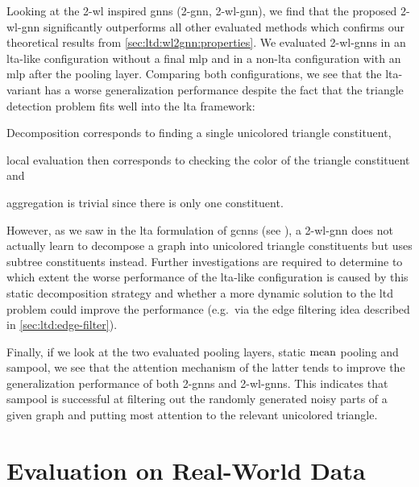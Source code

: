 Looking at the 2-\acs{wl} inspired \acp{gnn} (2-\acs{gnn}, 2-\acs{wl}-\acs{gnn}), we find that the proposed 2-\acs{wl}-\acs{gnn} significantly outperforms all other evaluated methods which confirms our theoretical results from \cref{sec:ltd:wl2gnn:properties}.
We evaluated 2-\acs{wl}-\acsp{gnn} in an \acs{lta}-like configuration without a final \ac{mlp} and in a non-\acs{lta} configuration with an \ac{mlp} after the pooling layer.
Comparing both configurations, we see that the \acs{lta}-variant has a worse generalization performance despite the fact that the triangle detection problem fits well into the \ac{lta} framework:
\begin{enumerate*}[label={\circled{\small\arabic*}}]
	\item Decomposition corresponds to finding a single unicolored triangle constituent,
	\item local evaluation then corresponds to checking the color of the triangle constituent and
	\item aggregation is trivial since there is only one constituent.
\end{enumerate*}

However, as we saw in the \ac{lta} formulation of \acp{gcnn} (see ), a 2-\acs{wl}-\acs{gnn} does not actually learn to decompose a graph into unicolored triangle constituents but uses subtree constituents instead.
Further investigations are required to determine to which extent the worse performance of the \acs{lta}-like configuration is caused by this static decomposition strategy and whether a more dynamic solution to the \acf{ltd} problem could improve the performance (e.g.\ via the edge filtering idea described in \cref{sec:ltd:edge-filter}).

Finally, if we look at the two evaluated pooling layers, static $\operatorname{mean}$ pooling and \ac{sampool}, we see that the attention mechanism of the latter tends to improve the generalization performance of both 2-\acsp{gnn} and 2-\acs{wl}-\acsp{gnn}.
This indicates that \ac{sampool} is successful at filtering out the randomly generated noisy parts of a given graph and putting most attention to the relevant unicolored triangle.

\section{Evaluation on Real-World Data}%
\label{sec:eval:real}

